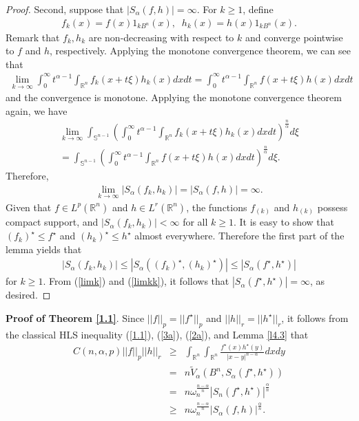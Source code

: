 \documentclass[preprint,12pt]{elsarticle}
\begin{document}
\begin{proof}
	Second, suppose that $| {S}_{\alpha }(f,h)| =\infty $. For $k\ge 1
	$, define
	\begin{eqnarray*}
		{f}_{k}(x)=f(x){1}_{kB^{n}}(x),\;\;{h}_{k}(x)=h(x){1}_{kB^{n}}(x).
	\end{eqnarray*} 
Remark that ${f}_{k}, {h}_{k}$ are non-decreasing with respect to $k$ and converge pointwise to $f$ and $h$, respectively.
	Applying the monotone convergence theorem, we can see that
	\begin{eqnarray*}
		\lim_{k\to \infty }\int_{0}^{\infty }{t }^{\alpha-1}\int_{\mathbb{R}^n}f_{k}(x+t\xi )h_{k}(x)dxdt=\int_{0}^{\infty }{t }^{\alpha-1}\int_{\mathbb{R}^n}f(x+t\xi )h(x)dxdt
	\end{eqnarray*} 
	and the convergence is monotone. Applying the monotone convergence theorem again, we have
	\begin{eqnarray*}
		\lim_{k\to \infty }\int_{\mathbb{S}^{n-1}}\left(\int_{0}^{\infty }{t }^{\alpha-1}\int_{\mathbb{R}^n}f_{k}(x+t\xi )h_{k}(x)dxdt\right)^{\frac{n}{\alpha }}d\xi \\	=\int_{\mathbb{S}^{n-1}}\left(\int_{0}^{\infty }{t }^{\alpha-1}\int_{\mathbb{R}^n}f(x+t\xi )h(x)dxdt\right)^{\frac{n}{\alpha }}d\xi .
	\end{eqnarray*} 
	Therefore,
	\begin{eqnarray}\label{limk}
		\lim_{k\to \infty }| {S}_{\alpha }(f_{k},h_{k})|=| {S}_{\alpha }(f,h)|=\infty.
	\end{eqnarray} 
	Given that $f\in {L}^{p} (\mathbb{R}^n)$ and $h\in {L}^{r} (\mathbb{R}^n)$, the functions $f_{(k)}$ and $h_{(k)}$ possess compact support, and $| {S}_{\alpha }(f_{k},h_{k})| < \infty $ for all $k\ge 1$. It is easy to show that $(f_{k})^{\star } \le f^{\star }$ and $(h_{k})^{\star } \le h^{\star }$ almost everywhere. Therefore the first part of the lemma yields that
	\begin{eqnarray}\label{limkk}
		| {S}_{\alpha }(f_{k},h_{k})| \leq  | {S}_{\alpha }((f_{k})^{\star },(h_{k})^{\star })|\leq  | {S}_{\alpha }(f^{\star },h^{\star })|
	\end{eqnarray} 
	for $k\ge 1$. From (\ref{limk}) and (\ref{limkk}), it follows that $| {S}_{\alpha }(f^{\star },h^{\star })|=\infty$, as desired.
\end{proof}
\noindent\textbf{Proof of Theorem \ref{1.1}}.
Since ${||f||}_{p}={||f^{\star }||}_{p}$ and ${||h||}_{r}={||h^{\star }||}_{r}$, it follows from the classical HLS inequality (\ref{1.1}), (\ref{3a}), (\ref{2a}), and Lemma \ref{l4.3} that
\begin{eqnarray}\label{e4.2}
	C(n, \alpha, p){||f||}_{p}{||h||}_{r}&\geq&\int_{\mathbb{R}^n}\int_{\mathbb{R}^n}\frac{f^{\star }(x)h^{\star }(y)}{{\left| x-y\right |}^{n-\alpha}}dxdy\nonumber\\
	&=& n\widetilde{V}_{\alpha}\left ({B}^{n},{S}_{\alpha }(f^{\star },h^{\star })\right)\nonumber\\
	&=&n{\omega}_{n}^{\frac{n-\alpha}{n}}{|{S}_{n}(f^{\star },h^{\star })|}^{\frac{\alpha}{n}} \nonumber\\
	&\geq&n{\omega}_{n}^{\frac{n-\alpha}{n}}{|{S}_{\alpha}(f,h)|}^{\frac{\alpha}{n}}.
\end{eqnarray}
\end{document}
